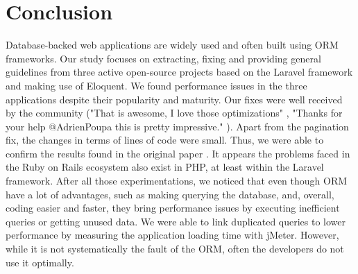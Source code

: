 \documentclass[sigconf]{acmart}
\begin{document}
\section{Conclusion}
Database-backed web applications are widely used and often built using ORM frameworks. Our study focuses on extracting, fixing and providing general guidelines from three active open-source projects based on the Laravel framework and making use of Eloquent. We found performance issues in the three applications despite their popularity and maturity. Our fixes were well received by the community ("That is awesome, I love those optimizations" \cite{prdashboardmonica}, "Thanks for your help @AdrienPoupa this is pretty impressive." \cite{prpeoplemonica}). Apart from the pagination fix, the changes in terms of lines of code were small. Thus, we were able to confirm the results found in the original paper \cite{paper}. It appears the problems faced in the Ruby on Rails ecosystem also exist in PHP, at least within the Laravel framework. After all those experimentations, we noticed that even though ORM have a lot of advantages, such as making querying the database, and, overall, coding easier and faster, they bring performance issues by executing inefficient queries or getting unused data. We were able to link duplicated queries to lower performance by measuring the application loading time with jMeter. However, while it is not systematically the fault of the ORM, often the developers do not use it optimally.



\newpage

\end{document}
